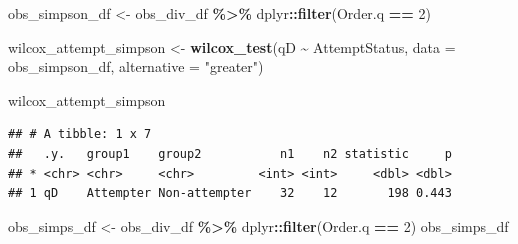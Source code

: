 \documentclass[
]{article}
\newenvironment{Shaded}{\begin{snugshade}}{\end{snugshade}}
\newcommand{\AttributeTok}[1]{\textcolor[rgb]{0.13,0.29,0.53}{#1}}
\newcommand{\DecValTok}[1]{\textcolor[rgb]{0.00,0.00,0.81}{#1}}
\newcommand{\FunctionTok}[1]{\textcolor[rgb]{0.13,0.29,0.53}{\textbf{#1}}}
\newcommand{\NormalTok}[1]{#1}
\newcommand{\OtherTok}[1]{\textcolor[rgb]{0.56,0.35,0.01}{#1}}
\newcommand{\SpecialCharTok}[1]{\textcolor[rgb]{0.81,0.36,0.00}{\textbf{#1}}}
\newcommand{\StringTok}[1]{\textcolor[rgb]{0.31,0.60,0.02}{#1}}
\begin{document}
\begin{Shaded}
\begin{Highlighting}[]
\NormalTok{obs\_simpson\_df }\OtherTok{\textless{}{-}}
\NormalTok{  obs\_div\_df }\SpecialCharTok{\%\textgreater{}\%}
\NormalTok{  dplyr}\SpecialCharTok{::}\FunctionTok{filter}\NormalTok{(Order.q }\SpecialCharTok{==} \DecValTok{2}\NormalTok{)}

\NormalTok{wilcox\_attempt\_simpson }\OtherTok{\textless{}{-}}
  \FunctionTok{wilcox\_test}\NormalTok{(qD }\SpecialCharTok{\textasciitilde{}}\NormalTok{ AttemptStatus,}
               \AttributeTok{data =}\NormalTok{ obs\_simpson\_df, }\AttributeTok{alternative =} \StringTok{"greater"}\NormalTok{)}

\NormalTok{wilcox\_attempt\_simpson}
\end{Highlighting}
\end{Shaded}

\begin{verbatim}
## # A tibble: 1 x 7
##   .y.   group1    group2           n1    n2 statistic     p
## * <chr> <chr>     <chr>         <int> <int>     <dbl> <dbl>
## 1 qD    Attempter Non-attempter    32    12       198 0.443
\end{verbatim}

\begin{Shaded}
\begin{Highlighting}[]
\NormalTok{obs\_simps\_df }\OtherTok{\textless{}{-}} 
\NormalTok{  obs\_div\_df }\SpecialCharTok{\%\textgreater{}\%}
\NormalTok{  dplyr}\SpecialCharTok{::}\FunctionTok{filter}\NormalTok{(Order.q }\SpecialCharTok{==} \DecValTok{2}\NormalTok{)}
\NormalTok{obs\_simps\_df}
\end{Highlighting}
\end{Shaded}
\end{document}
